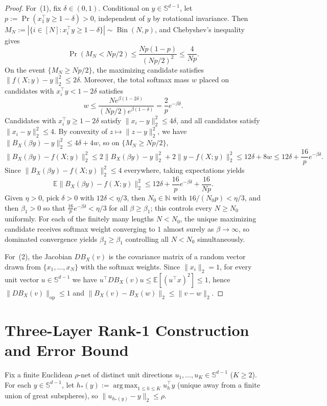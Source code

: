 \documentclass[11pt]{article}
\theoremstyle{plain}
\theoremstyle{definition}
\theoremstyle{remark}
\DeclareMathOperator{\Bin}{Bin}
\DeclareMathOperator*{\argmax}{arg\,max}
\begin{document}
\begin{proof}
For~(1), fix $\delta \in (0, 1)$.
Conditional on $y \in \mathbb{S}^{d-1}$, let $p := \Pr(x_1^\top y \ge 1 - \delta) > 0$, independent of $y$ by rotational invariance.
Then $M_N := |\{i \in [N] : x_i^\top y \ge 1 - \delta\}| \sim \Bin(N, p)$, and Chebyshev's inequality gives
\[
\Pr(M_N < Np/2) \le \frac{Np(1-p)}{(Np/2)^2} \le \frac{4}{Np}.
\]
On the event $\{M_N \ge Np/2\}$, the maximizing candidate satisfies $\|f(X; y) - y\|_2^2 \le 2\delta$.
Moreover, the total softmax mass $w$ placed on candidates with $x_i^\top y < 1 - 2\delta$ satisfies
\[
w \le \frac{N e^{\beta(1 - 2\delta)}}{(Np/2) e^{\beta(1 - \delta)}} = \frac{2}{p} e^{-\beta\delta}.
\]
Candidates with $x_i^\top y \ge 1 - 2\delta$ satisfy $\|x_i - y\|_2^2 \le 4\delta$, and all candidates satisfy $\|x_i - y\|_2^2 \le 4$.
By convexity of $z \mapsto \|z - y\|_2^2$, we have $\|B_X(\beta y) - y\|_2^2 \le 4\delta + 4w$, so on $\{M_N \ge Np/2\}$,
\[
\|B_X(\beta y) - f(X; y)\|_2^2
\le 2\|B_X(\beta y) - y\|_2^2 + 2\|y - f(X; y)\|_2^2
\le 12\delta + 8w
\le 12\delta + \frac{16}{p} e^{-\beta\delta}.
\]
Since $\|B_X(\beta y) - f(X; y)\|_2^2 \le 4$ everywhere, taking expectations yields
\[
\mathbb{E}\bigl\|B_X(\beta y) - f(X; y)\bigr\|_2^2
\le 12\delta + \frac{16}{p} e^{-\beta\delta} + \frac{16}{Np}.
\]
Given $\eta > 0$, pick $\delta > 0$ with $12\delta < \eta/3$, then $N_0 \in \mathbb{N}$ with $16/(N_0 p) < \eta/3$, and then $\beta_1 > 0$ so that $\frac{16}{p}e^{-\beta\delta} < \eta/3$ for all $\beta \ge \beta_1$; this controls every $N \ge N_0$ uniformly.
For each of the finitely many lengths $N < N_0$, the unique maximizing candidate receives softmax weight converging to $1$ almost surely as $\beta \to \infty$, so dominated convergence yields $\beta_2 \ge \beta_1$ controlling all $N < N_0$ simultaneously.

For~(2), the Jacobian $D B_X(v)$ is the covariance matrix of a random vector drawn from $\{x_1, \dots, x_N\}$ with the softmax weights.
Since $\|x_i\|_2 = 1$, for every unit vector $u \in \mathbb{S}^{d-1}$ we have $u^\top D B_X(v) u \le \mathbb{E}[(u^\top x)^2] \le 1$, hence $\|D B_X(v)\|_{\mathrm{op}} \le 1$ and $\|B_X(v) - B_X(w)\|_2 \le \|v - w\|_2$.
\end{proof}

\section{Three-Layer Rank-1 Construction and Error Bound}

Fix a finite Euclidean $\rho$-net of distinct unit directions $u_1, \dots, u_K \in \mathbb{S}^{d-1}$ ($K \ge 2$).
For each $y \in \mathbb{S}^{d-1}$, let $h_*(y) := \argmax_{1 \le h \le K} u_h^\top y$ (unique away from a finite union of great subspheres), so $\|u_{h_*(y)} - y\|_2 \le \rho$.
\end{document}
